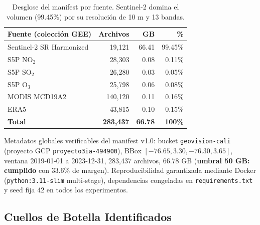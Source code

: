 \documentclass[10pt,a4paper,twocolumn]{article}
\begin{document}
\begin{table}[H]
  \centering
  \scriptsize
  \begin{tabular}{lrrr}
    \toprule
    \textbf{Fuente (colección GEE)} & \textbf{Archivos} & \textbf{GB} & \textbf{\%} \\
    \midrule
    Sentinel-2 SR Harmonized & 19,121 & 66.41 & 99.45\% \\
    S5P NO$_2$ & 28,303 & 0.08 & 0.11\% \\
    S5P SO$_2$ & 26,280 & 0.03 & 0.05\% \\
    S5P O$_3$ & 25,798 & 0.06 & 0.08\% \\
    MODIS MCD19A2 & 140,120 & 0.11 & 0.16\% \\
    ERA5 & 43,815 & 0.10 & 0.15\% \\
    \midrule
    \textbf{Total} & \textbf{283,437} & \textbf{66.78} & \textbf{100\%} \\
    \bottomrule
  \end{tabular}
  \caption{Desglose del manifest por fuente. Sentinel-2 domina el volumen (99.45\%) por su resolución de 10 m y 13 bandas.}
  \label{tab:manifest}
\end{table}

Metadatos globales verificables del manifest v1.0: bucket \texttt{geovision-cali} (proyecto GCP \texttt{proyecto3ia-494900}), BBox $[-76.65, 3.30, -76.30, 3.65]$, ventana 2019-01-01 a 2023-12-31, 283,437 archivos, 66.78 GB (\textbf{umbral 50 GB: cumplido} con 33.6\% de margen). Reproducibilidad garantizada mediante Docker (\texttt{python:3.11-slim} multi-stage), dependencias congeladas en \texttt{requirements.txt} y seed fija 42 en todos los experimentos.

\subsection{Cuellos de Botella Identificados}
\end{document}
